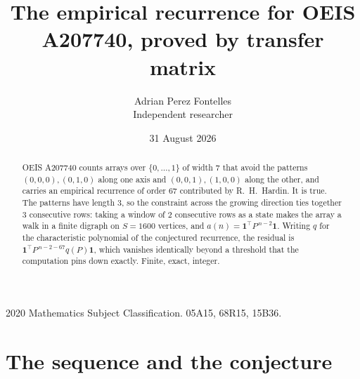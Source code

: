 \documentclass[11pt,a4paper]{article}
\title{The empirical recurrence for OEIS A207740, proved by transfer matrix}
\author{Adrian Perez Fontelles\\ \small Independent researcher}
\date{31 August 2026}
\theoremstyle{plain}
\theoremstyle{definition}
\begin{document}
\maketitle

\begin{abstract}
OEIS A207740 counts arrays over $\{0,\dots,1\}$ of width $7$ that avoid the patterns
$(0,0,0), (0,1,0)$ along one axis and $(0,0,1), (1,0,0)$ along the other, and carries an empirical recurrence of
order $67$ contributed by R.~H.~Hardin. It is true. The patterns have length $3$, so
the constraint across the growing direction ties together $3$ consecutive rows: taking a
window of $2$ consecutive rows as a state makes the array a walk in a finite digraph
on $S=1600$ vertices, and $a(n)=\mathbf{1}^{\!\top}P^{\,n-2}\mathbf{1}$. Writing $q$
for the characteristic polynomial of the conjectured recurrence, the residual is
$\mathbf{1}^{\!\top}P^{\,n-2-67}q(P)\mathbf{1}$, which vanishes identically
beyond a threshold that the computation pins down exactly. Finite, exact, integer.
\end{abstract}

\noindent\small 2020 Mathematics Subject Classification. 05A15, 68R15, 15B36.\normalsize

\section{The sequence and the conjecture}
\end{document}
